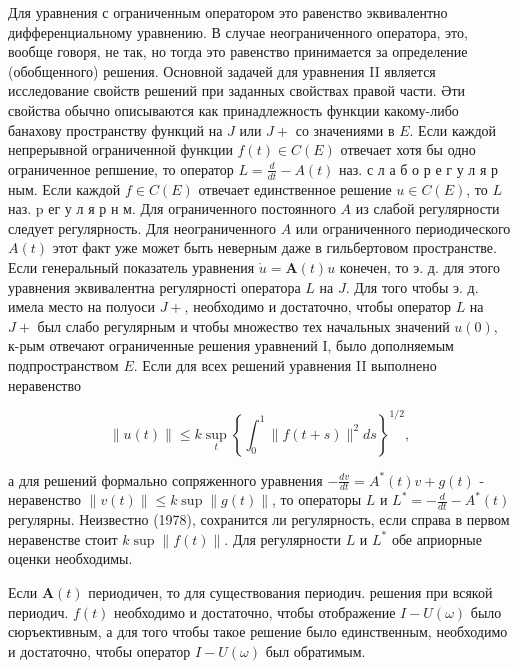 \documentclass[10pt]{article}
\begin{document}
Для уравнения с ограниченным оператором это равенство эквивалентно дифференциальному уравнению. В случае неограниченного оператора, это, вообще говоря, не так, но тогда это равенство принимается за определение (обобщенного) решения. Основной задачей для уравнения II является исследование свойств решений при заданных свойствах правой части. Әти свойства обычно описываются как принадлежность функции какому-либо банахову пространству функций на $J$ или $J+$ со значениями в $E$. Если каждой непрерывной ограниченной функции $f(t) \in C(E)$ отвечает хотя бы одно ограниченное репшение, то оператор $L=\frac{d}{d t}-A(t)$ наз. с л а б о р е г у л я р ным. Если каждой $f \in C(E)$ отвечает единственное решение $u \in C(E)$, то $L$ наз. p ег у л я р н м. Для ограниченного постоянного $A$ из слабой регулярности следует регулярность. Для неограниченного $A$ или ограниченного периодического $A(t)$ этот факт уже может быть неверным даже в гильбертовом пространстве. Если генеральный показатель уравнения $\dot{u}=\boldsymbol{A}(t) u$ конечен, то э. д. для этого уравнения эквивалентна регулярності оператора $L$ на $J$. Для того чтобы э. д. имела место на полуоси $J+$, необходимо и достаточно, чтобы оператор $L$ на $J+$ был слабо регулярным и чтобы множество тех начальных значений $u(0)$, к-рым отвечают ограниченные решения уравнений I, было дополняемым подпространством $E$. Если для всех решений уравнения II выполнено неравенство



\[

\|u(t)\| \leqslant k \sup _{t}\left\{\int_{0}^{1}\|f(t+s)\|^{2} d s\right\}^{1 / 2},

\]



а для решений формально сопряженного уравнения $-\frac{d v}{d t}=A^{*}(t) v+g(t)$ - неравенство $\|v(t)\| \leqslant k \sup \|g(t)\|$, то операторы $L$ и $L^{*}=-\frac{d}{d t}-A^{*}(t)$ регулярны. Неизвестно (1978), сохранится ли регулярность, если справа в первом неравенстве стоит $k \sup \|f(t)\|$. Для регулярности $L$ и $L^{*}$ обе априорные оценки необходимы.



Если $\boldsymbol{A}(t)$ периодичен, то для существования периодич. решения при всякой периодич. $f(t)$ необходимо и достаточно, чтобы отображение $I-U(\omega)$ было сюръективным, а для того чтобы такое решение было единственным, необходимо и достаточно, чтобы оператор $I-U(\omega)$ был обратимым.
\end{document}
